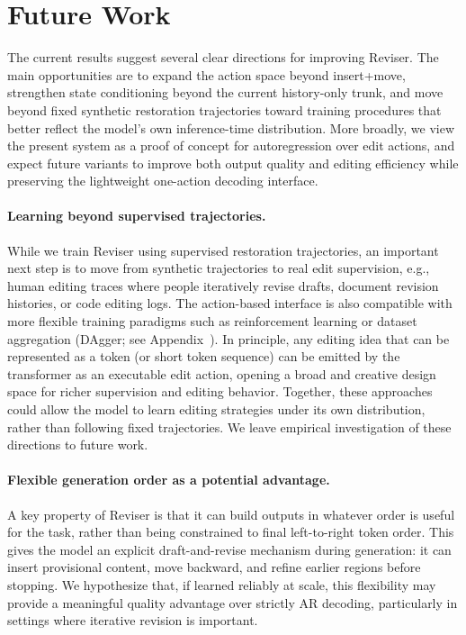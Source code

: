 \documentclass[11pt]{article}
\begin{document}
\section{Future Work}
\label{sec:future}
The current results suggest several clear directions for improving Reviser. The main opportunities are to expand the action space beyond insert+move, strengthen state conditioning beyond the current history-only trunk, and move beyond fixed synthetic restoration trajectories toward training procedures that better reflect the model's own inference-time distribution. More broadly, we view the present system as a proof of concept for autoregression over edit actions, and expect future variants to improve both output quality and editing efficiency while preserving the lightweight one-action decoding interface.

\paragraph{Learning beyond supervised trajectories.}
While we train Reviser using supervised restoration trajectories, an important next step is to move from synthetic trajectories to real edit supervision, e.g., human editing traces where people iteratively revise drafts, document revision histories, or code editing logs. The action-based interface is also compatible with more flexible training paradigms such as reinforcement learning or dataset aggregation (DAgger; see Appendix~). In principle, any editing idea that can be represented as a token (or short token sequence) can be emitted by the transformer as an executable edit action, opening a broad and creative design space for richer supervision and editing behavior. Together, these approaches could allow the model to learn editing strategies under its own distribution, rather than following fixed trajectories. We leave empirical investigation of these directions to future work.

\paragraph{Flexible generation order as a potential advantage.}
A key property of Reviser is that it can build outputs in whatever order is useful for the task, rather than being constrained to final left-to-right token order. This gives the model an explicit draft-and-revise mechanism during generation: it can insert provisional content, move backward, and refine earlier regions before stopping. We hypothesize that, if learned reliably at scale, this flexibility may provide a meaningful quality advantage over strictly AR decoding, particularly in settings where iterative revision is important.
\end{document}
